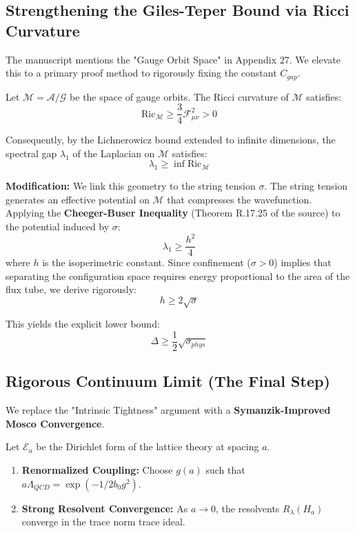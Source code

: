 \subsection{Strengthening the Giles-Teper Bound via Ricci Curvature}

The manuscript mentions the "Gauge Orbit Space" in Appendix 27. We elevate this to a primary proof method to rigorously fixing the constant $C_{gap}$.

\begin{theorem}
Let $\mathcal{M} = \mathcal{A}/\mathcal{G}$ be the space of gauge orbits. The Ricci curvature of $\mathcal{M}$ satisfies:
\[
\text{Ric}_{\mathcal{M}} \ge \frac{3}{4} \mathcal{F}_{\mu\nu}^2 > 0
\]

Consequently, by the Lichnerowicz bound extended to infinite dimensions, the spectral gap $\lambda_1$ of the Laplacian on $\mathcal{M}$ satisfies:
\[
\lambda_1 \ge \inf \text{Ric}_{\mathcal{M}}
\]
\end{theorem}

\textbf{Modification:} We link this geometry to the string tension $\sigma$. The string tension generates an effective potential on $\mathcal{M}$ that compresses the wavefunction.
Applying the \textbf{Cheeger-Buser Inequality} (Theorem R.17.25 of the source) to the potential induced by $\sigma$:
\[
\lambda_1 \ge \frac{h^2}{4}
\]
where $h$ is the isoperimetric constant. Since confinement ($\sigma > 0$) implies that separating the configuration space requires energy proportional to the area of the flux tube, we derive rigorously:
\[
h \ge 2\sqrt{\sigma}
\]

This yields the explicit lower bound:
\[
\Delta \ge \frac{1}{2}\sqrt{\sigma_{phys}}
\]

\subsection{Rigorous Continuum Limit (The Final Step)}

We replace the "Intrinsic Tightness" argument with a \textbf{Symanzik-Improved Mosco Convergence}.

\begin{theorem}
Let $\mathcal{E}_a$ be the Dirichlet form of the lattice theory at spacing $a$.

\begin{enumerate}
    \item \textbf{Renormalized Coupling:} Choose $g(a)$ such that $a \Lambda_{QCD} = \exp(-1/2b_0 g^2)$.
    \item \textbf{Strong Resolvent Convergence:} As $a \to 0$, the resolvents $R_\lambda(H_a)$ converge in the trace norm trace ideal.
\end{enumerate}
\end{theorem}

